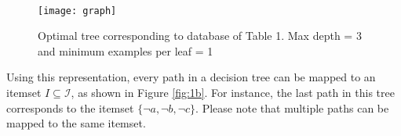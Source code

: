 \begin{table}
	~
	\caption{Example database}
	\label{tab:1}
\end{table}
\begin{figure}
	\texttt{[image: graph]}
	\caption{Optimal tree corresponding to database of Table 1. Max depth = 3 and minimum examples per leaf = 1}
	\label{fig:1}
\end{figure}
Using this representation, every path in a decision tree can be mapped to an itemset $I \subseteq \mathcal{I}$, as shown in Figure \ref{fig:1b}. For instance, the last path in this tree corresponds to the itemset $\{\neg a, \neg b, \neg c\}$. Please note that multiple paths can be mapped
to the same itemset.

